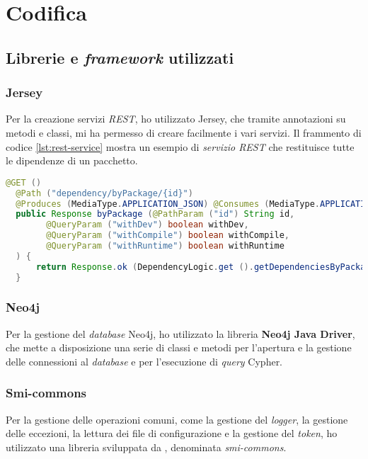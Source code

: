 
\section{Codifica}
\subsection*{Librerie e \textit{framework} utilizzati}
\subsubsection*{Jersey}
Per la creazione servizi \textit{REST}, ho utilizzato Jersey, che tramite annotazioni su metodi e classi, 
mi ha permesso di creare facilmente i vari servizi.
Il frammento di codice \ref*{lst:rest-service} mostra un esempio di \textit{servizio REST} che restituisce tutte le dipendenze di un pacchetto.\\
\begin{lstlisting}[language=Java, caption={Esempio di \textit{servizio REST} utilizzando Jersey.},captionpos=b, label={lst:rest-service}]
  @GET ()
  @Path ("dependency/byPackage/{id}")
  @Produces (MediaType.APPLICATION_JSON) @Consumes (MediaType.APPLICATION_JSON)
  public Response byPackage (@PathParam ("id") String id, 
        @QueryParam ("withDev") boolean withDev, 
        @QueryParam ("withCompile") boolean withCompile, 
        @QueryParam ("withRuntime") boolean withRuntime
  ) {
      return Response.ok (DependencyLogic.get ().getDependenciesByPackage (id, withDev, withCompile, withRuntime)).build ();
  }
\end{lstlisting}

\subsubsection*{Neo4j}
Per la gestione del \textit{database} Neo4j, ho utilizzato la libreria \textbf{Neo4j Java Driver}, 
che mette a disposizione una serie di classi e metodi per l'apertura e la gestione delle connessioni al \textit{database} e 
per l'esecuzione di \textit{query} Cypher.\\

\subsubsection*{Smi-commons}
Per la gestione delle operazioni comuni, come la gestione del \textit{logger}, la gestione delle eccezioni, la lettura dei 
file di configurazione e la gestione del \textit{token}, ho utilizzato una libreria sviluppata da \azienda{}, denominata \textit{smi-commons}.\\

